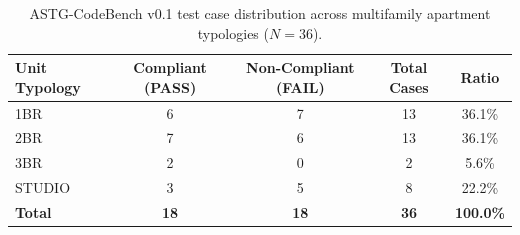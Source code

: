 \begin{table}[t]
\centering
\small
\caption{ASTG-CodeBench v0.1 test case distribution across multifamily apartment typologies ($N=36$).}
\label{tab:dataset_breakdown}
\begin{tabular}{lcccc}
\toprule
\textbf{Unit Typology} & \textbf{Compliant (PASS)} & \textbf{Non-Compliant (FAIL)} & \textbf{Total Cases} & \textbf{Ratio} \\
\midrule
1BR & 6 & 7 & 13 & 36.1\% \\
2BR & 7 & 6 & 13 & 36.1\% \\
3BR & 2 & 0 & 2 & 5.6\% \\
STUDIO & 3 & 5 & 8 & 22.2\% \\
\midrule
\textbf{Total} & \textbf{18} & \textbf{18} & \textbf{36} & \textbf{100.0\%} \\
\bottomrule
\end{tabular}
\end{table}